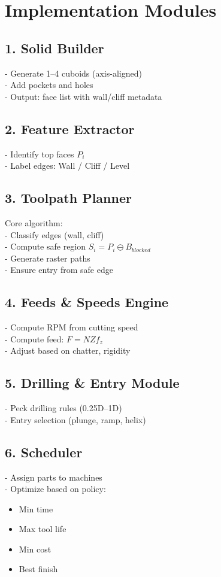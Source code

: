 \documentclass{article}
\begin{document}
\section{Implementation Modules}

\subsection{1. Solid Builder}
- Generate 1--4 cuboids (axis-aligned) \\
- Add pockets and holes \\
- Output: face list with wall/cliff metadata

\subsection{2. Feature Extractor}
- Identify top faces $P_i$ \\
- Label edges: Wall / Cliff / Level

\subsection{3. Toolpath Planner}
Core algorithm: \\
- Classify edges (wall, cliff) \cite{toolpath} \\
- Compute safe region $S_i = P_i \ominus B_{blocked}$ \cite{toolpath} \\
- Generate raster paths \\
- Ensure entry from safe edge

\subsection{4. Feeds \& Speeds Engine}
- Compute RPM from cutting speed \cite{feeds} \\
- Compute feed: $F = N Z f_z$ \cite{feeds} \\
- Adjust based on chatter, rigidity

\subsection{5. Drilling \& Entry Module}
- Peck drilling rules (0.25D--1D) \cite{feeds} \\
- Entry selection (plunge, ramp, helix)

\subsection{6. Scheduler}
- Assign parts to machines \\
- Optimize based on policy:
\begin{itemize}
\item Min time
\item Max tool life
\item Min cost
\item Best finish
\end{itemize}
\end{document}
